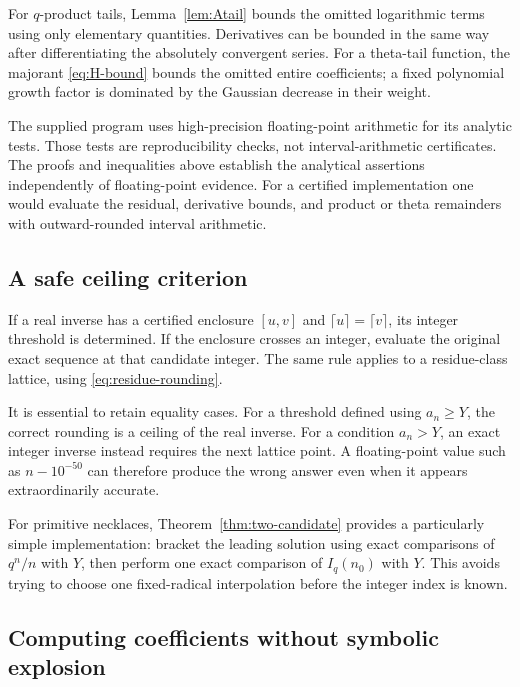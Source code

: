 \documentclass[11pt]{article}
\numberwithin{equation}{section}
\theoremstyle{definition}
\begin{document}
For $q$-product tails, Lemma~\ref{lem:Atail} bounds the omitted logarithmic terms using only elementary quantities. Derivatives can be bounded in the same way after differentiating the absolutely convergent series. For a theta-tail function, the majorant \eqref{eq:H-bound} bounds the omitted entire coefficients; a fixed polynomial growth factor is dominated by the Gaussian decrease in their weight.

The supplied program uses high-precision floating-point arithmetic for its analytic tests. Those tests are reproducibility checks, not interval-arithmetic certificates. The proofs and inequalities above establish the analytical assertions independently of floating-point evidence. For a certified implementation one would evaluate the residual, derivative bounds, and product or theta remainders with outward-rounded interval arithmetic.

\subsection{A safe ceiling criterion}

If a real inverse has a certified enclosure $[u,v]$ and
$\lceil u\rceil=\lceil v\rceil$, its integer threshold is determined. If the enclosure crosses an integer, evaluate the original exact sequence at that candidate integer. The same rule applies to a residue-class lattice, using \eqref{eq:residue-rounding}.

It is essential to retain equality cases. For a threshold defined using $a_n\ge Y$, the correct rounding is a ceiling of the real inverse. For a condition $a_n>Y$, an exact integer inverse instead requires the next lattice point. A floating-point value such as $n-10^{-50}$ can therefore produce the wrong answer even when it appears extraordinarily accurate.

For primitive necklaces, Theorem~\ref{thm:two-candidate} provides a particularly simple implementation: bracket the leading solution using exact comparisons of $q^n/n$ with $Y$, then perform one exact comparison of $I_q(n_0)$ with $Y$. This avoids trying to choose one fixed-radical interpolation before the integer index is known.

\subsection{Computing coefficients without symbolic explosion}
\end{document}
